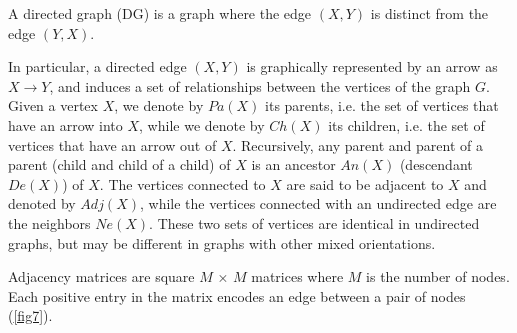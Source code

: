 \begin{definition}
    A directed graph (DG) is a graph where the edge $(X, Y)$ is distinct from the edge $(Y, X)$.
\end{definition}
In particular, a directed edge $(X, Y)$ is graphically represented by an arrow as $X \rightarrow Y$, and induces a set of relationships between the vertices of the graph $G$. Given a vertex $X$, we denote by $Pa(X)$ its parents, i.e. the set of vertices that have an arrow into $X$, while we denote by $Ch(X)$ its children, i.e. the set of vertices that have an arrow out of $X$. Recursively, any parent and parent of a parent (child and child of a child) of $X$ is an ancestor $An(X)$ (descendant $De(X)$) of $X$.
The vertices connected to $X$ are said to be adjacent to $X$ and denoted by $Adj(X)$, while the vertices connected with an undirected edge are the neighbors $Ne(X)$. These two sets of vertices are identical in undirected graphs, but may be different in graphs with other mixed orientations.
\begin{definition}
    Adjacency matrices are square $M$ × $M$ matrices where $M$ is the number of nodes. Each positive entry in the matrix encodes an edge between a pair of nodes (\ref{fig7}).
\end{definition}

